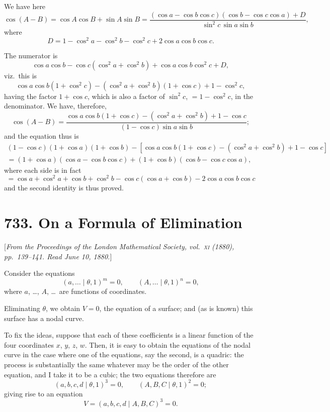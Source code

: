 \documentclass[12pt,a4paper]{article}
\theoremstyle{plain}
\begin{document}
We have here
\[
\cos(A-B) = \cos A\cos B + \sin A\sin B
= \frac{(\cos a - \cos b\cos c)(\cos b - \cos c\cos a) + D}
{\sin^2 c\,\sin a\sin b},
\]
where
\[
D = 1 - \cos^2 a - \cos^2 b - \cos^2 c + 2\cos a\cos b\cos c.
\]

The numerator is
\[
\cos a\cos b - \cos c(\cos^2 a + \cos^2 b) + \cos a\cos b\cos^2 c + D,
\]
viz.~this is
\[
\cos a\cos b(1+\cos^2 c) - (\cos^2 a + \cos^2 b)(1+\cos c) + 1 - \cos^2 c,
\]
having the factor $1+\cos c$, which is also a factor of $\sin^2 c$, $=1-\cos^2 c$,
in the denominator. We have, therefore,
\[
\cos(A-B) = \frac{\cos a\cos b(1+\cos c) - (\cos^2 a + \cos^2 b) + 1 - \cos c}
{(1-\cos c)\sin a\sin b};
\]
and the equation thus is
\begin{multline*}
(1-\cos c)(1+\cos a)(1+\cos b)
- [\cos a\cos b(1+\cos c) - (\cos^2 a + \cos^2 b) + 1 - \cos c]\\
= (1+\cos a)(\cos a - \cos b\cos c) + (1+\cos b)(\cos b - \cos c\cos a),
\end{multline*}
where each side is in fact
\[
= \cos a + \cos^2 a + \cos b + \cos^2 b - \cos c(\cos a + \cos b) - 2\cos a\cos b\cos c
\]
and the second identity is thus proved.

\newpage
\section*{733. On a Formula of Elimination}

[\textit{From the Proceedings of the London Mathematical Society, vol.~\textsc{xi} (1880), pp.~139--141.
Read June 10, 1880.}]

Consider the equations
\[
(a,\ldots\mid\theta,1)^m = 0,\qquad
(A,\ldots\mid\theta,1)^n = 0,
\]
where $a$, \dots, $A$, \dots\ are functions of coordinates.

Eliminating $\theta$, we obtain $V=0$, the equation of a surface; and
(as is known) this surface has a nodal curve.

To fix the ideas, suppose that each of these coefficients is a linear
function of the four coordinates $x$, $y$, $z$, $w$.
Then, it is easy to obtain the equations of the nodal curve in the case
where one of the equations, say the second, is a quadric: the process
is substantially the same whatever may be the order of the other equation,
and I take it to be a cubic; the two equations therefore are
\[
(a,b,c,d\mid\theta,1)^3 = 0,\qquad
(A,B,C\mid\theta,1)^2 = 0;
\]
giving rise to an equation
\[
V = (a,b,c,d\mid A,B,C)^3 = 0.
\]
\end{document}
